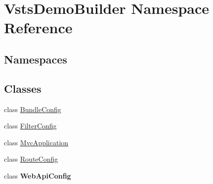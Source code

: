 \hypertarget{namespace_vsts_demo_builder}{}\section{Vsts\+Demo\+Builder Namespace Reference}
\label{namespace_vsts_demo_builder}
\subsection*{Namespaces}
\begin{DoxyCompactItemize}
\end{DoxyCompactItemize}
\subsection*{Classes}
\begin{DoxyCompactItemize}
\item 
class \mbox{\hyperlink{class_vsts_demo_builder_1_1_bundle_config}{Bundle\+Config}}
\item 
class \mbox{\hyperlink{class_vsts_demo_builder_1_1_filter_config}{Filter\+Config}}
\item 
class \mbox{\hyperlink{class_vsts_demo_builder_1_1_mvc_application}{Mvc\+Application}}
\item 
class \mbox{\hyperlink{class_vsts_demo_builder_1_1_route_config}{Route\+Config}}
\item 
class {\bfseries Web\+Api\+Config}
\end{DoxyCompactItemize}
